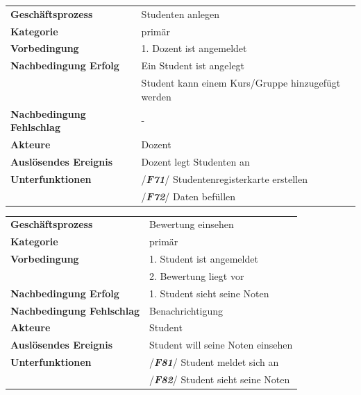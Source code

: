 		
			\begin{table}[H]
				\begin{tabular}{|ll}
					\rowcolor{hellgrau}\multicolumn{2}{l}{/\textbf{\textit{F70}}/}\\\hline
					 \textbf{Geschäftsprozess} & Studenten anlegen\\ 
					 \textbf{Kategorie} & primär \\ 
					 \textbf{Vorbedingung} & 1. Dozent ist angemeldet \phantom{aaaaaaaaaaaaaaaaaaaaaaaaaaaaaaa} \\
					 \textbf{Nachbedingung Erfolg} & Ein Student ist angelegt\\
					 & Student kann einem Kurs/Gruppe hinzugefügt werden\\
					 \textbf{Nachbedingung Fehlschlag} & -\\
					 \textbf{Akteure} & Dozent \\ 
					 \textbf{Auslösendes Ereignis} & Dozent legt Studenten an\\ 
					 \textbf{Unterfunktionen} &  /\textbf{\textit{F71}}/  Studentenregisterkarte erstellen\\
					 & /\textbf{\textit{F72}}/ Daten befüllen\\
				 \end{tabular} 
				\label{tab:F70}
				\end{table}	
			
			\begin{table}[H]
				\begin{tabular}{|ll}
				\rowcolor{hellgrau}	\multicolumn{2}{l}{/\textbf{\textit{F80}}/}\\\hline
					 \textbf{Geschäftsprozess} & Bewertung einsehen\\ 
					 \textbf{Kategorie} & primär \\ 
					 \textbf{Vorbedingung} & 1. Student ist angemeldet \phantom{aaaaaaaaaaaaaaaaaaaaaaaaaaaaaaa} \\
					 &2. Bewertung liegt vor\\
					 \textbf{Nachbedingung Erfolg} & 1. Student sieht seine Noten\\
					  \textbf{Nachbedingung Fehlschlag} & Benachrichtigung\\
					 \textbf{Akteure} & Student \\ 
					 \textbf{Auslösendes Ereignis} & Student will seine Noten einsehen\\ 
					 \textbf{Unterfunktionen} &  /\textbf{\textit{F81}}/  Student meldet sich an\\
					 & /\textbf{\textit{F82}}/  Student sieht seine Noten\\
				 \end{tabular} 
				\label{tab:F80}
				\end{table}	


